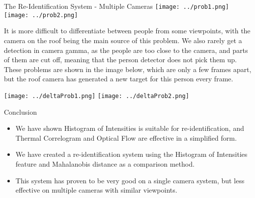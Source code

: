 \documentclass[final]{beamer}
\begin{document}
\begin{frame}{}
\begin{columns}[t]
\begin{column}{.49\linewidth}
\begin{block}{The Re-Identification System - Multiple Cameras}
 		\texttt{[image: ../prob1.png]}  
 		\hspace{.4cm}
        \texttt{[image: ../prob2.png]}  
        
        \justify It is more difficult to differentiate between people from some viewpoints, with the camera on the roof being the main source of this problem. We also rarely get a detection in camera gamma, as the people are too close to the camera, and parts of them are cut off, meaning that the person detector does not pick them up. These problems are shown in the image below, which are only a few frames apart, but the roof camera has generated a new target for this person every frame.
        
        \texttt{[image: ../deltaProb1.png]}
        \hspace{.4cm}
        \texttt{[image: ../deltaProb2.png]}  
        \end{block}
        
        \begin{block}{Conclusion}
        \begin{itemize}
         \item We have shown Histogram of Intensities is suitable for re-identification, and Thermal Correlogram and Optical Flow are effective in a simplified form. 
         \item We have created a re-identification system using the Histogram of Intensities feature and Mahalanobis distance as a comparison method. 
         
         \item This system has proven to be very good on a single camera system, but less effective on multiple cameras with similar viewpoints.
        \end{itemize}
        \end{block}

        \end{column}
    \end{columns}
    
  \end{frame}
\end{document}
